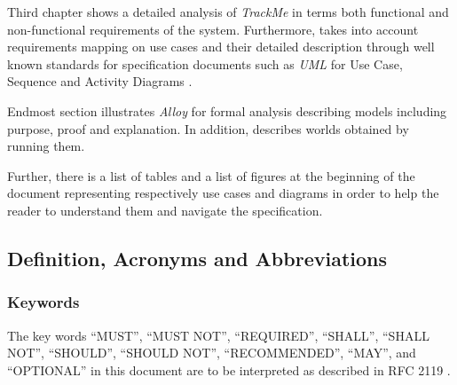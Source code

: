 \documentclass[a4paper]{article}
\begin{document}
        Third chapter shows a detailed analysis of \textit{TrackMe} in terms both functional and non-functional requirements of the system. Furthermore, takes into account requirements mapping on use cases and their detailed description through well known standards for specification documents such as \textit{UML} for Use Case, Sequence and Activity Diagrams \cite{rumbaugh2004unified}.
        
        Endmost section illustrates \textit{Alloy} for formal analysis \cite{jackson2006software} describing models including purpose, proof and explanation. In addition, describes worlds obtained by running them.
        
        Further, there is a list of tables and a list of figures at the beginning of the document representing respectively use cases and diagrams in order to help the reader to understand them and navigate the specification.
        
    \subsection{Definition, Acronyms and  Abbreviations}
            \subsubsection{Keywords}
            The key words “MUST”, “MUST NOT”, “REQUIRED”, “SHALL”, “SHALL NOT”, “SHOULD”, “SHOULD NOT”, “RECOMMENDED”, “MAY”, and “OPTIONAL” in this document are to be interpreted as described in RFC 2119 \cite{bradner1997key}.
\end{document}
